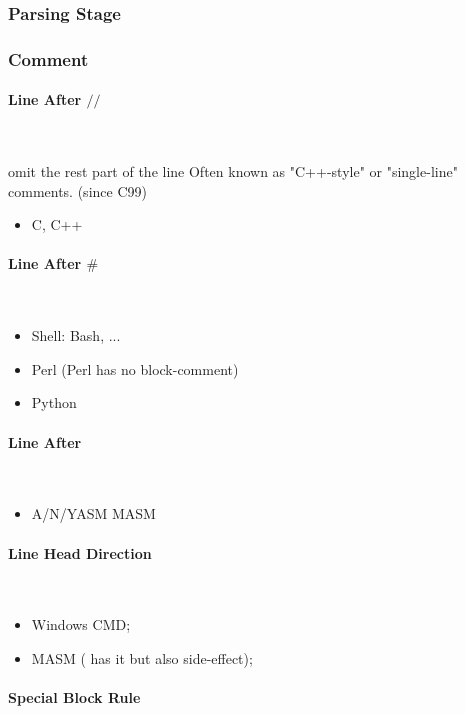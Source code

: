 

\subsubsection{Parsing Stage}


\subsubsection{Comment}

\paragraph{Line After $//$} \

omit the rest part of the line
Often known as "C++-style" or "single-line" comments.
(since C99)
\begin{itemize}
\item {C, C++}
\end{itemize}

\paragraph{Line After $\#$} \
\begin{itemize}
\item Shell: Bash, ...
\item Perl (Perl has no block-comment)
\item Python
\end{itemize}

\paragraph{Line After $\;$} \
\begin{itemize}
\item A/N/YASM MASM
\end{itemize}

\paragraph{Line Head Direction} \
\begin{itemize}
\item {} Windows CMD;
\item \B{TITLE} MASM (\B{END} has it but also side-effect);
\end{itemize}

\paragraph{Special Block Rule} \ \\


